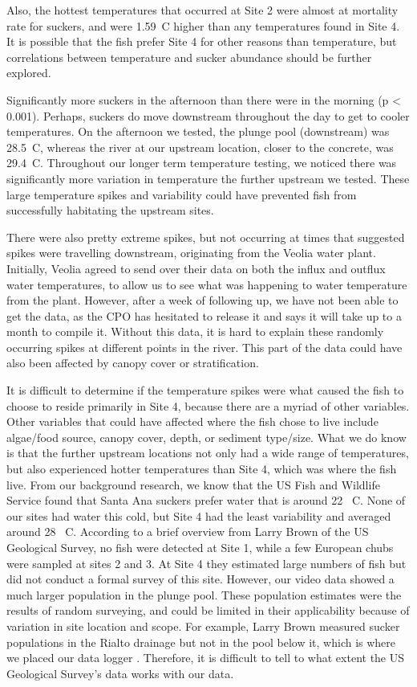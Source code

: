 \documentclass{article}\usepackage[]{graphicx}\usepackage[]{color}
\begin{document}
Also, the hottest temperatures that occurred at Site 2 were almost at mortality rate for suckers, and were 1.59\textdegree~C higher than any temperatures found in Site 4. It is possible that the fish prefer Site 4 for other reasons than temperature, but correlations between temperature and sucker abundance should be further explored.

Significantly more suckers in the afternoon than there were in the morning (p < 0.001).  Perhaps, suckers do move downstream throughout the day to get to cooler temperatures.  On the afternoon we tested, the plunge pool (downstream) was 28.5\textdegree~C, whereas the river at our upstream location, closer to the concrete, was 29.4\textdegree~C. Throughout our longer term temperature testing, we noticed there was significantly more variation in temperature the further upstream we tested. These large temperature spikes and variability could have prevented fish from successfully habitating the upstream sites.

There were also pretty extreme spikes, but not occurring at times that suggested spikes were travelling downstream, originating from the Veolia water plant. Initially, Veolia agreed to send over their data on both the influx and outflux water temperatures, to allow us to see what was happening to water temperature from the plant. However, after a week of following up, we have not been able to get the data, as the CPO has hesitated to release it and says it will take up to a month to compile it. Without this data, it is hard to explain these randomly occurring spikes at different points in the river. This part of the data could have also been affected by canopy cover or stratification. 

It is difficult to determine if the temperature spikes were what caused the fish to choose to reside primarily in Site 4, because there are a myriad of other variables. Other variables that could have affected where the fish chose to live include algae/food source, canopy cover, depth, or sediment type/size. What we do know is that the further upstream locations not only had a wide range of temperatures, but also experienced hotter temperatures than Site 4, which was where the fish live. From our background research, we know that the US Fish and Wildlife Service found that Santa Ana suckers prefer water that is around 22 \textdegree~C. None of our sites had water this cold, but Site 4 had the least variability and averaged around 28 \textdegree~C. According to a brief overview from Larry Brown of the US Geological Survey, no fish were detected at Site 1, while a few European chubs were sampled at sites 2 and 3. At Site 4 they estimated large numbers of fish but did not conduct a formal survey of this site. However, our video data showed a much larger population in the plunge pool. These population estimates were the results of random surveying, and could be limited in their applicability because of variation in site location and scope. For example, Larry Brown measured sucker populations in the Rialto drainage but not in the pool below it, which is where we placed our data logger \citep{perscomBrown}. Therefore, it is difficult to tell to what extent the US Geological Survey's data works with our data. 
\end{document}
